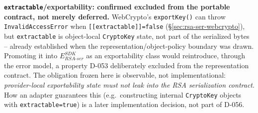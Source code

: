 \documentclass[11pt,a4paper]{article}
\begin{document}
\textbf{\texttt{extractable}/exportability: confirmed excluded from the portable contract, not merely deferred.} WebCrypto's \texttt{exportKey()} can throw \texttt{InvalidAccessError} when \texttt{[[extractable]]=false} (\S\ref{sec:rsa-ser-webcrypto}), but \texttt{extractable} is object-local \texttt{CryptoKey} state, not part of the serialized bytes -- already established when the representation/object-policy boundary was drawn. Promoting it into $E_{RSA\text{-}ser}^{SDK}$ as an exportability class would reintroduce, through the error model, a property D-053 deliberately excluded from the representation contract. The obligation frozen here is observable, not implementational: \emph{provider-local exportability state must not leak into the RSA serialization contract}. How an adapter guarantees this (e.g.\ constructing internal \texttt{CryptoKey} objects with \texttt{extractable=true}) is a later implementation decision, not part of D-056.
\end{document}
